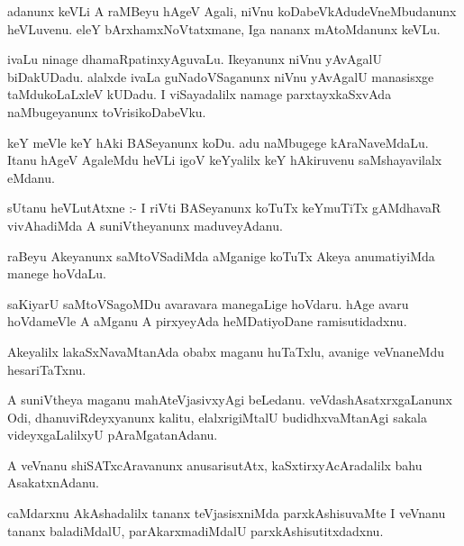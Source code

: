 \documentclass{article}
\begin{document}
\begin{mn}
adanunx keVLi A raMBeyu hAgeV Agali, niVnu koDabeVkAdudeVneMbudanunx heVLuvenu.  
eleY bArxhamxNoVtatxmane, Iga nananx mAtoMdanunx keVLu.
\end{mn}

\begin{mn}
ivaLu ninage dhamaRpatinxyAguvaLu. Ikeyanunx niVnu yAvAgalU biDakUDadu. 
alalxde ivaLa guNadoVSaganunx niVnu yAvAgalU manasisxge taMdukoLaLxleV kUDadu.  
I viSayadalilx namage parxtayxkaSxvAda naMbugeyanunx toVrisikoDabeVku.
\end{mn}

\begin{mn}
keY meVle keY hAki BASeyanunx koDu.  adu naMbugege kAraNaveMdaLu.  Itanu hAgeV 
AgaleMdu heVLi igoV keYyalilx  keY hAkiruvenu saMshayavilalx eMdanu.
\end{mn}

\begin{mn}
sUtanu heVLutAtxne :- I riVti BASeyanunx koTuTx keYmuTiTx gAMdhavaR vivAhadiMda 
A suniVtheyanunx maduveyAdanu.
\end{mn}

\begin{mn}
raBeyu Akeyanunx saMtoVSadiMda aMganige koTuTx Akeya anumatiyiMda  manege hoVdaLu. 
\end{mn}

\begin{mn}
saKiyarU saMtoVSagoMDu avaravara manegaLige hoVdaru. hAge avaru hoVdameVle A aMganu 
A pirxyeyAda heMDatiyoDane ramisutidadxnu.
\end{mn}

\begin{mn}
Akeyalilx lakaSxNavaMtanAda obabx maganu huTaTxlu, avanige veVnaneMdu hesariTaTxnu.
\end{mn}

\begin{mn}
A suniVtheya  maganu mahAteVjasivxyAgi beLedanu. veVdashAsatxrxgaLanunx Odi, dhanuviRdeyxyanunx 
kalitu, elalxrigiMtalU  budidhxvaMtanAgi sakala videyxgaLalilxyU pAraMgatanAdanu. 
\end{mn}

\begin{mn}
A veVnanu shiSATxcAravanunx anusarisutAtx, kaSxtirxyAcAradalilx bahu AsakatxnAdanu.
\end{mn}


\begin{mn}
caMdarxnu  AkAshadalilx tananx teVjasisxniMda parxkAshisuvaMte I veVnanu tananx 
baladiMdalU, parAkarxmadiMdalU parxkAshisutitxdadxnu.
\end{mn}
\end{document}
